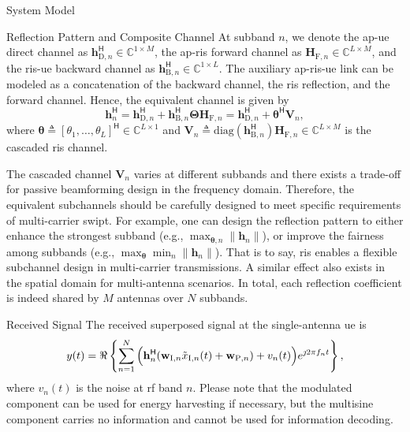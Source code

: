 \begin{section}{System Model}
\begin{subsection}{Reflection Pattern and Composite Channel}
		At subband $n$, we denote the \gls{ap}-\gls{ue} direct channel as $\mathbf{h}_{\mathrm{D},n}^\mathsf{H} \in \mathbb{C}^{1 \times M}$, the \gls{ap}-\gls{ris} forward channel as $\mathbf{H}_{\mathrm{F},n} \in \mathbb{C}^{L \times M}$, and the \gls{ris}-\gls{ue} backward channel as $\mathbf{h}_{\mathrm{B},n}^\mathsf{H} \in \mathbb{C}^{1 \times L}$.
		The auxiliary \gls{ap}-\gls{ris}-\gls{ue} link can be modeled as a concatenation of the backward channel, the \gls{ris} reflection, and the forward channel.
		Hence, the equivalent channel is given by
		\begin{equation}\label{eq:h_n}
			\mathbf{h}_{n}^\mathsf{H} = \mathbf{h}_{\mathrm{D},n}^\mathsf{H} + \mathbf{h}_{\mathrm{B},n}^\mathsf{H} \mathbf{\Theta} \mathbf{H}_{\mathrm{F},n} = \mathbf{h}_{\mathrm{D},n}^\mathsf{H} + \boldsymbol{\theta}^\mathsf{H} \mathbf{V}_{n},
		\end{equation}
		where $\boldsymbol{\theta} \triangleq [\theta_1,\ldots,\theta_L]^\mathsf{H} \in \mathbb{C}^{L \times 1}$ and $\mathbf{V}_{n} \triangleq \mathrm{diag}(\mathbf{h}_{\mathrm{B},n}^\mathsf{H})\mathbf{H}_{\mathrm{F},n} \in \mathbb{C}^{L \times M}$ is the cascaded \gls{ris} channel.

		\begin{remark}\label{re:subband_tradeoff}
			The cascaded channel $\mathbf{V}_{n}$ varies at different subbands and there exists a trade-off for passive beamforming design in the frequency domain.
			Therefore, the equivalent subchannels should be carefully designed to meet specific requirements of multi-carrier \gls{swipt}. For example, one can design the reflection pattern to either enhance the strongest subband (e.g., $\max_{\boldsymbol{\theta},n} \lVert \mathbf{h}_n \rVert$), or improve the fairness among subbands (e.g., $\max_{\boldsymbol{\theta}} \min_n \lVert \mathbf{h}_n \rVert$). That is to say, \gls{ris} enables a flexible subchannel design in multi-carrier transmissions. A similar effect also exists in the spatial domain for multi-antenna scenarios. In total, each reflection coefficient is indeed shared by $M$ antennas over $N$ subbands.
		\end{remark}
	\end{subsection}


	\begin{subsection}{Received Signal}
		The received superposed signal at the single-antenna \gls{ue} is
		\begin{equation}
			y(t) = \Re\left\{\sum_{n=1}^N{\Bigl(\mathbf{h}_{n}^\mathsf{H}}{(\mathbf{w}_{\mathrm{I},n}\tilde{x}_{\mathrm{I},n}(t)+\mathbf{w}_{\mathrm{P},n})+v_n(t)\Bigr)}{e^{\jmath 2{\pi}{f_n}{t}}}\right\},
		\end{equation}
		where $v_n(t)$ is the noise at \gls{rf} band $n$.
		Please note that the modulated component can be used for energy harvesting if necessary, but the multisine component carries no information and cannot be used for information decoding.
	\end{subsection}



\end{section}
